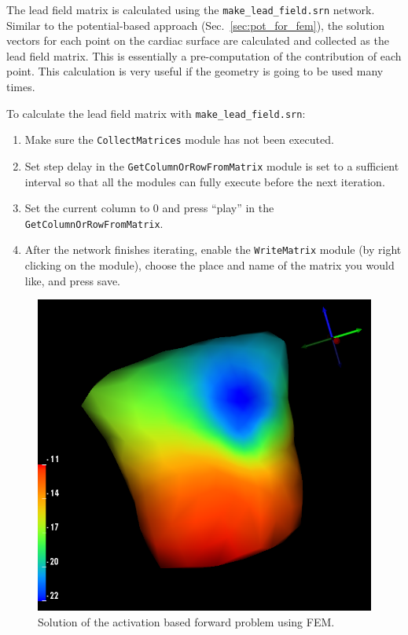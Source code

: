 The lead field matrix is calculated using the {\tt make\_lead\_field.srn} network.
Similar to the potential-based approach (Sec.~\ref{sec:pot_for_fem}), the solution
vectors for each point on the cardiac surface are calculated and collected as the
lead field matrix. This is essentially a pre-computation of the contribution of each
point. This calculation is very useful if the geometry is going to be used many times.


To calculate the lead field matrix with {\tt make\_lead\_field.srn}:
\begin{enumerate}
\item{Make sure the {\tt CollectMatrices} module has not been executed.}
\item{Set step delay in the {\tt GetColumnOrRowFromMatrix} module is set to a sufficient interval so that all the modules can fully execute before the next iteration.}
\item{Set the current column to 0 and press ``play'' in the {\tt GetColumnOrRowFromMatrix}.}
\item{After the network finishes iterating, enable the {\tt WriteMatrix} module (by right clicking on the module), choose the place and name of the matrix you would like, and press save.  }
\end{enumerate}

\begin{figure}[H]
\begin{center}
\includegraphics[width=\textwidth]{ECGToolkitGuide_figures/act_for_fem_results.png}
\caption{Solution of the activation based forward problem using FEM.}
\label{fig:act_fem_for_sol}
\end{center}
\end{figure}


